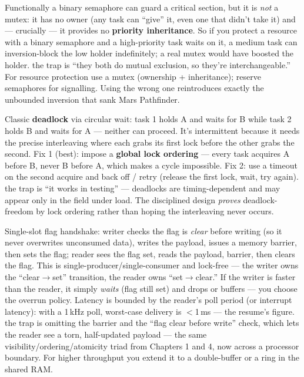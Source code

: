 Functionally a binary semaphore can guard a critical section, but it is
\emph{not} a mutex: it has no owner (any task can ``give'' it, even one that
didn't take it) and --- crucially --- it provides no \textbf{priority
inheritance}. So if you protect a resource with a binary semaphore and a
high-priority task waits on it, a medium task can inversion-block the low holder
indefinitely; a real mutex would have boosted the holder. \trap the trap is
``they both do mutual exclusion, so they're interchangeable.'' For resource
protection use a mutex (ownership + inheritance); reserve semaphores for
signalling. Using the wrong one reintroduces exactly the unbounded inversion
that sank Mars Pathfinder.

Classic \textbf{deadlock} via circular wait: task 1 holds A and waits for B
while task 2 holds B and waits for A --- neither can proceed. It's intermittent
because it needs the precise interleaving where each grabs its first lock before
the other grabs the second. Fix 1 (best): impose a \textbf{global lock
ordering} --- every task acquires A before B, never B before A, which makes a
cycle impossible. Fix 2: use a timeout on the second acquire and back off /
retry (release the first lock, wait, try again). \trap the trap is ``it works in
testing'' --- deadlocks are timing-dependent and may appear only in the field
under load. The disciplined design \emph{proves} deadlock-freedom by lock
ordering rather than hoping the interleaving never occurs.

Single-slot flag handshake: writer checks the flag is \emph{clear} before
writing (so it never overwrites unconsumed data), writes the payload, issues a
memory barrier, then sets the flag; reader sees the flag set, reads the payload,
barrier, then clears the flag. This is single-producer/single-consumer and
lock-free --- the writer owns the ``clear$\rightarrow$set'' transition, the
reader owns ``set$\rightarrow$clear.'' If the writer is faster than the reader,
it simply \emph{waits} (flag still set) and drops or buffers --- you choose the
overrun policy. Latency is bounded by the reader's poll period (or interrupt
latency): with a 1\,kHz poll, worst-case delivery is $<$1\,ms --- the resume's
figure. \trap the trap is omitting the barrier and the ``flag clear before
write'' check, which lets the reader see a torn, half-updated payload --- the
same visibility/ordering/atomicity triad from Chapters 1 and 4, now across a
processor boundary. For higher throughput you extend it to a double-buffer or a
ring in the shared RAM.


